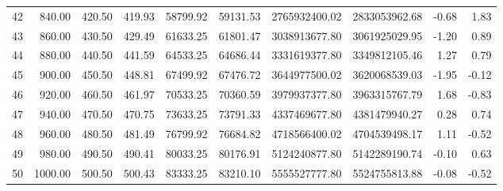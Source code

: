 \begin{table}[ht]
\begin{center}
{\begin{tabular}{rrrrrrrrrr}
        42 & 840.00 & 420.50 & 419.93 & 58799.92 & 59131.53 & 2765932400.02 & 2833053962.68 & -0.68 & 1.83 \\ 
        43 & 860.00 & 430.50 & 429.49 & 61633.25 & 61801.47 & 3038913677.80 & 3061925029.95 & -1.20 & 0.89 \\ 
        44 & 880.00 & 440.50 & 441.59 & 64533.25 & 64686.44 & 3331619377.80 & 3349812105.46 & 1.27 & 0.79 \\ 
        45 & 900.00 & 450.50 & 448.81 & 67499.92 & 67476.72 & 3644977500.02 & 3620068539.03 & -1.95 & -0.12 \\ 
        46 & 920.00 & 460.50 & 461.97 & 70533.25 & 70360.59 & 3979937377.80 & 3963315767.79 & 1.68 & -0.83 \\ 
        47 & 940.00 & 470.50 & 470.75 & 73633.25 & 73791.33 & 4337469677.80 & 4381479940.27 & 0.28 & 0.74 \\ 
        48 & 960.00 & 480.50 & 481.49 & 76799.92 & 76684.82 & 4718566400.02 & 4704539498.17 & 1.11 & -0.52 \\ 
        49 & 980.00 & 490.50 & 490.41 & 80033.25 & 80176.91 & 5124240877.80 & 5142289190.74 & -0.10 & 0.63 \\ 
        50 & 1000.00 & 500.50 & 500.43 & 83333.25 & 83210.10 & 5555527777.80 & 5524755813.88 & -0.08 & -0.52 \\ 
        \hline
      \end{tabular}
    }
  \end{center}
\end{table}

